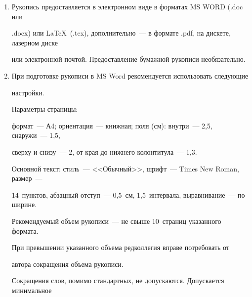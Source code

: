 {{\begin{enumerate}[1.]
быть присланы авторами в~кратчайшие сроки.\\[-12pt]





\item Рукопись предоставляется в электронном виде в форматах MS WORD (.doc или


.docx) или \LaTeX\  (.tex), дополнительно~--- в формате .pdf, на дискете, лазерном диске


или электронной почтой. Предоставление бумажной рукописи необязательно.\\[-12pt]





\item При подготовке рукописи в MS Word рекомендуется использовать следующие


настройки.





Параметры страницы:


формат~--- А4; ориентация~--- книжная; поля (см): внутри~--- 2,5, снаружи~--- 1,5,


сверху и снизу~--- 2, от края до нижнего колонтитула~--- 1,3.





Основной текст: стиль~--- <<Обычный>>, шрифт~--- Times New Roman, размер~---


14~пунк\-тов, абзацный отступ~--- 0,5~см, 1,5~интервала, выравнивание~--- по ширине.





\def\rightkol{Правила подготовки рукописей статей}


\def\leftkol{Правила подготовки рукописей статей}













Рекомендуемый объем рукописи~--- не свыше 10~страниц указанного формата.


При превышении указанного объема редколлегия вправе потребовать от 


автора сокращения объема рукописи.





Сокращения слов, помимо стандартных, не допускаются. Допускается минимальное



\end{enumerate}}}
